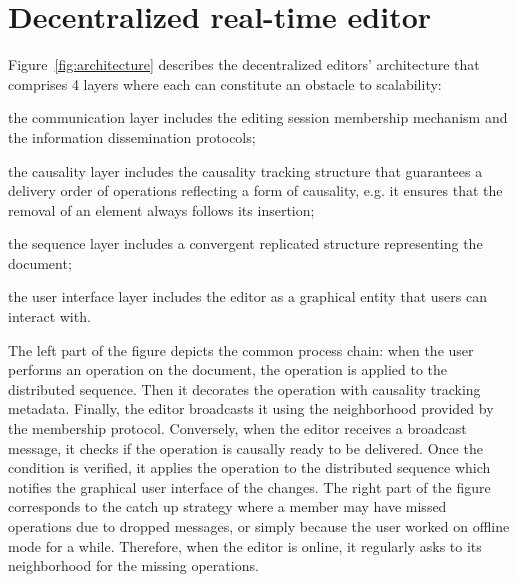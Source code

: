 
\section{Decentralized real-time editor}
\label{sec:editor}



Figure~\ref{fig:architecture} describes the decentralized editors' architecture
that comprises 4 layers where each can constitute an obstacle to scalability:
\begin{inparaenum}[(i)]
\item the communication layer includes the editing session membership mechanism
  and the information dissemination protocols;
\item the causality layer includes the causality tracking structure that
  guarantees a delivery order of operations reflecting a form of causality,
  e.g. it ensures that the removal of an element always follows its insertion;
\item the sequence layer includes a convergent replicated structure representing
  the document;
\item the user interface layer includes the editor as a graphical entity that
  users can interact with. %
\end{inparaenum}

The left part of the figure depicts the common process chain: when the user
performs an operation on the document, the operation is applied to the
distributed sequence. Then it decorates the operation with causality tracking
metadata. Finally, the editor broadcasts it using the neighborhood provided by
the membership protocol.  Conversely, when the editor receives a broadcast
message, it checks if the operation is causally ready to be delivered. Once the
condition is verified, it applies the operation to the distributed sequence
which notifies the graphical user interface of the changes.  The right part of
the figure corresponds to the catch up strategy where a member may have missed
operations due to dropped messages, or simply because the user worked on offline
mode for a while. Therefore, when the editor is online, it regularly asks to its
neighborhood for the missing operations.

